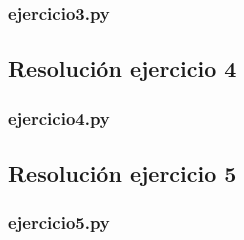 \documentclass[11pt,a4paper]{article}
\begin{document}
		\subsubsection{ejercicio3.py}
			

	\newpage

	\subsection{Resolución ejercicio 4}\label{ejercicio_4}
		\subsubsection{ejercicio4.py}

	\newpage

	\subsection{Resolución ejercicio 5}\label{ejercicio_5}
		\subsubsection{ejercicio5.py}
			
\end{document}
